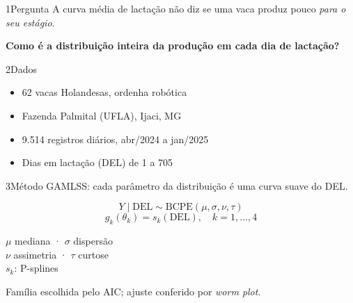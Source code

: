 \documentclass{rbras-poster}
\begin{document}
 

\begin{colunaesquerda}
\begin{secao}{1}{Pergunta}
A curva média de lactação não diz se uma vaca produz pouco
\textit{para o seu estágio}.
\par\vspace{16bp}
\textbf{Como é a distribuição inteira da produção em cada dia de lactação?}
\end{secao}

\begin{secao}{2}{Dados}
\begin{itemize}
\item 62 vacas Holandesas, ordenha robótica
\item Fazenda Palmital (UFLA), Ijaci, MG
\item 9.514 registros diários, abr/2024 a jan/2025
\item Dias em lactação (DEL) de 1 a 705
\end{itemize}
\end{secao}

\begin{secao}{3}{Método}
GAMLSS: cada parâmetro da distribuição é uma curva suave do DEL.
\begin{caixaequacao}
\begin{equation*}
Y \mid \mathrm{DEL} \sim \mathrm{BCPE}(\mu,\sigma,\nu,\tau)
\end{equation*}
\begin{equation*}
g_k(\theta_k) = s_k(\mathrm{DEL}), \quad k = 1,\dots,4
\end{equation*}
{\tamRotulo\color{rbCinza} $\mu$ mediana · $\sigma$ dispersão\\
  $\nu$ assimetria · $\tau$ curtose\\ $s_k$: P-splines\par}
\end{caixaequacao}
\par\vspace{24bp}
Família escolhida pelo AIC; ajuste conferido por \textit{worm plot}.
\end{secao}
\end{colunaesquerda}
\end{document}
